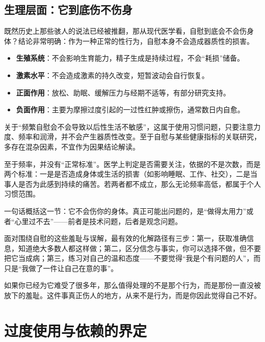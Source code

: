 \documentclass[12pt,UTF8]{ctexbook}
\begin{document}
\subsection{生理层面：它到底伤不伤身}

既然历史上那些骇人的说法已经被推翻，那从现代医学看，自慰到底会不会伤身体？结论非常明确：作为一种正常的性行为，自慰本身不会造成器质性的损害。

\begin{itemize}
\item \textbf{生殖系统}：不会影响生育能力，精子生成是持续过程，不会“耗损”储备。
\item \textbf{激素水平}：不会造成激素的持久改变，短暂波动会自行恢复。
\item \textbf{正面作用}：放松、助眠、缓解压力与经期不适等，有部分研究支持。
\item \textbf{负面作用}：主要为摩擦过度引起的一过性红肿或擦伤，通常数日内自愈。
\end{itemize}

关于“频繁自慰会不会导致以后性生活不敏感”，这属于使用习惯问题，只要注意力度、频率和润滑，并不会产生器质性改变。至于自慰与某些健康指标的关联研究，多存在混杂因素，不宜作为因果结论解读。

至于频率，并没有“正常标准”。医学上判定是否需要关注，依据的不是次数，而是两个标准：一是是否造成身体或生活的损害（如影响睡眠、工作、社交），二是当事人是否为此感到持续的痛苦。若两者都不成立，那么无论频率高低，都属于个人习惯范围。

\begin{tcolorbox}[colback=pink!5!white,colframe=red!50!black,title=贴心小叮咛]
一句话概括这一节：它不会伤你的身体。真正可能出问题的，是“做得太用力”或者“心里过不去”——前者是技术问题，后者是观念问题。
\end{tcolorbox}

面对围绕自慰的这些羞耻与误解，最有效的化解路径有三步：第一，获取准确信息，知道绝大多数人都这样做；第二，区分信念与事实，你可以选择不做，但不要把它当成病；第三，练习对自己的温和态度——不要觉得“我是个有问题的人”，而只是“我做了一件让自己在意的事”。

\begin{tcolorbox}[colback=pink!5!white,colframe=red!50!black,title=贴心小叮咛]
如果你已经为它难受了很多年，那么值得处理的不是那个行为，而是那份一直没被放下的羞耻。这件事真正伤人的地方，从来不是行为，而是你因此觉得自己不好。
\end{tcolorbox}

\section{过度使用与依赖的界定}
\end{document}

